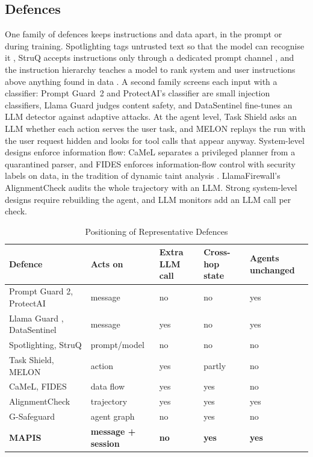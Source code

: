 \documentclass{ieeeaccess}
\begin{document}
\subsection{Defences}
One family of defences keeps instructions and data apart, in the prompt or during training. Spotlighting tags untrusted text so that the model can recognise it \cite{hines2024spotlighting}, StruQ accepts instructions only through a dedicated prompt channel \cite{chen2025struq}, and the instruction hierarchy teaches a model to rank system and user instructions above anything found in data \cite{wallace2024hierarchy}. A second family screens each input with a classifier: Prompt Guard~2 \cite{promptguard2025} and ProtectAI's classifier \cite{protectai2024} are small injection classifiers, Llama Guard \cite{inan2023llamaguard} judges content safety, and DataSentinel \cite{liu2025datasentinel} fine-tunes an LLM detector against adaptive attacks. At the agent level, Task Shield \cite{jia2025taskshield} asks an LLM whether each action serves the user task, and MELON \cite{zhu2025melon} replays the run with the user request hidden and looks for tool calls that appear anyway. System-level designs enforce information flow: CaMeL \cite{debenedetti2025camel} separates a privileged planner from a quarantined parser, and FIDES \cite{costa2025fides} enforces information-flow control with security labels on data, in the tradition of dynamic taint analysis \cite{newsome2005taint}. LlamaFirewall's AlignmentCheck \cite{chennabasappa2025llamafirewall} audits the whole trajectory with an LLM. Strong system-level designs require rebuilding the agent, and LLM monitors add an LLM call per check.

\begin{table}[!t]
\caption{Positioning of Representative Defences}
\label{tab:position}
\centering\footnotesize
\begin{tabular}{L{2.4cm}L{1.6cm}C{0.95cm}C{0.95cm}C{0.95cm}}
\toprule
Defence & Acts on & Extra LLM call & Cross-hop state & Agents unchanged \\
\midrule
Prompt Guard 2, ProtectAI \cite{promptguard2025,protectai2024} & message & no & no & yes \\
Llama Guard \cite{inan2023llamaguard}, DataSentinel \cite{liu2025datasentinel} & message & yes & no & yes \\
Spotlighting, StruQ \cite{hines2024spotlighting,chen2025struq} & prompt/model & no & no & no \\
Task Shield, MELON \cite{jia2025taskshield,zhu2025melon} & action & yes & partly & no \\
CaMeL, FIDES \cite{debenedetti2025camel,costa2025fides} & data flow & yes & yes & no \\
AlignmentCheck \cite{chennabasappa2025llamafirewall} & trajectory & yes & yes & yes \\
G-Safeguard \cite{wang2025gsafeguard} & agent graph & no & yes & no \\
\textbf{MAPIS} & \textbf{message + session} & \textbf{no} & \textbf{yes} & \textbf{yes} \\
\bottomrule
\end{tabular}
\end{table}
\end{document}
